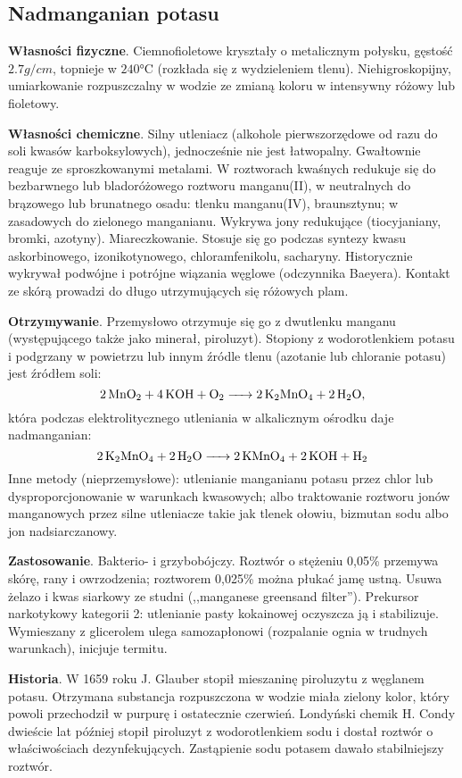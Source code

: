 \subsection{Nadmanganian potasu }
\textbf{Własności fizyczne}. 
Ciemnofioletowe kryształy o metalicznym połysku, gęstość $2.7 \si{g \per cm}$, topnieje w $240\si{\celsius}$ (rozkłada się z wydzieleniem tlenu).
Niehigroskopijny, umiarkowanie rozpuszczalny w wodzie ze zmianą koloru w intensywny różowy lub fioletowy.

\textbf{Własności chemiczne}. 
Silny utleniacz (alkohole pierwszorzędowe od razu do soli kwasów karboksylowych), jednocześnie nie jest łatwopalny.
Gwałtownie reaguje ze sproszkowanymi metalami.
W roztworach kwaśnych redukuje się do bezbarwnego lub bladoróżowego roztworu manganu(II), w neutralnych do brązowego lub brunatnego osadu: tlenku manganu(IV), braunsztynu; w zasadowych do zielonego manganianu.
Wykrywa jony redukujące (tiocyjaniany, bromki, azotyny).
Miareczkowanie.
Stosuje się go podczas syntezy kwasu askorbinowego, izonikotynowego, chloramfenikolu, sacharyny.
Historycznie wykrywał podwójne i potrójne wiązania węglowe (odczynnika Baeyera).
Kontakt ze skórą prowadzi do długo utrzymujących się różowych plam.

\textbf{Otrzymywanie}.
Przemysłowo otrzymuje się go z dwutlenku manganu (występującego także jako minerał, piroluzyt).
Stopiony z wodorotlenkiem potasu i podgrzany w powietrzu lub innym źródle tlenu (azotanie lub chloranie potasu) jest źródłem soli: $$\ce{2 MnO2 + 4 KOH + O2 -> 2 K2MnO4 + 2 H2O},$$ która podczas elektrolitycznego utleniania w alkalicznym ośrodku daje nadmanganian: $$\ce{2 K2MnO4 + 2 H2O -> 2 KMnO4 + 2 KOH + H2}$$
Inne metody (nieprzemysłowe): utlenianie manganianu potasu przez chlor lub dysproporcjonowanie w warunkach kwasowych; albo traktowanie roztworu jonów manganowych przez silne utleniacze takie jak tlenek ołowiu, bizmutan sodu albo jon nadsiarczanowy.

\textbf{Zastosowanie}.
Bakterio- i grzybobójczy.
Roztwór o stężeniu 0,05\% przemywa skórę, rany i owrzodzenia; roztworem 0,025\% można płukać jamę ustną.
Usuwa żelazo i kwas siarkowy ze studni (,,manganese greensand filter'').
Prekursor narkotykowy kategorii 2: utlenianie pasty kokainowej oczyszcza ją i stabilizuje.
Wymieszany z glicerolem ulega samozapłonowi (rozpalanie ognia w trudnych warunkach), inicjuje termitu.

\textbf{Historia}.
W 1659 roku J. Glauber stopił mieszaninę piroluzytu z węglanem potasu.
Otrzymana substancja rozpuszczona w wodzie miała zielony kolor, który powoli przechodził w purpurę i ostatecznie czerwień.
Londyński chemik H. Condy dwieście lat później stopił piroluzyt z wodorotlenkiem sodu i dostał roztwór o właściwościach dezynfekujących.
Zastąpienie sodu potasem dawało stabilniejszy roztwór.
